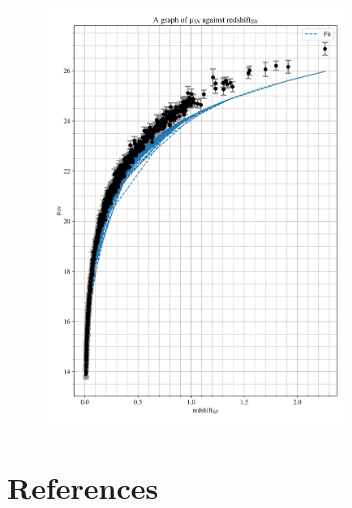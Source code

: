 \documentclass[12pt, a4paper]{article}
\begin{document}
\begin{figure}[H]
    \centering
    \includegraphics[width = 0.7\textwidth]{Graph 5.png}
\end{figure}

\section{References}
\printbibliography[heading = none]
\end{document}
